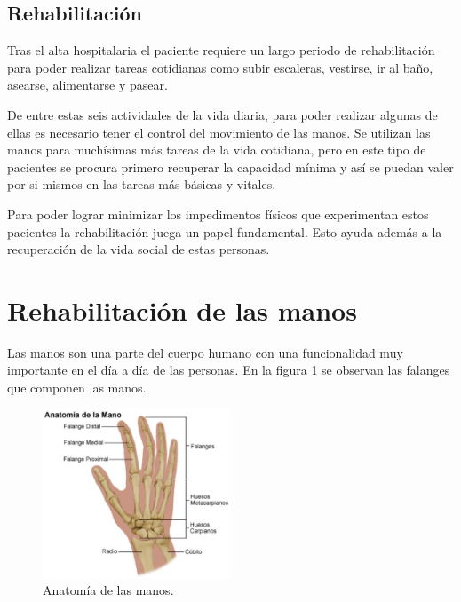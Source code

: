 \subsection{Rehabilitación}
\label{sec:neuronal2}

Tras el alta hospitalaria el paciente requiere un largo periodo de rehabilitación para poder realizar tareas cotidianas como subir escaleras, vestirse, ir al baño, asearse, alimentarse y pasear. \cite{secuelasIctus}

De entre estas seis actividades de la vida diaria, para poder realizar algunas de ellas es necesario tener el control del movimiento de las manos. Se utilizan las manos para muchísimas más tareas de la vida cotidiana, pero en este tipo de pacientes se procura primero recuperar la capacidad mínima y así se puedan valer por si mismos en las tareas más básicas y vitales.

Para poder lograr minimizar los impedimentos físicos que experimentan estos pacientes la rehabilitación juega un papel fundamental. Esto ayuda además a la recuperación de la vida social de estas personas. 


\section{Rehabilitación de las manos}
\label{sec:fuindamentos2}

Las manos son una parte del cuerpo humano con una funcionalidad muy importante en el día a día de las personas. En la figura \ref{fig:anatomiaMano} se observan las falanges que componen las manos. 

\begin{figure}[H]
	\centering
	\includegraphics[width=0.5\textwidth]{./img/anatomiaMano}
	\caption{Anatomía de las manos.  \cite{imgAnatomiaMano}}
	\label{fig:anatomiaMano}
\end{figure} 

